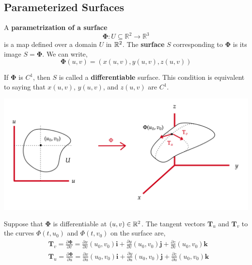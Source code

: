 \subsection{Parameterized Surfaces}
\begin{defn}
	A \textbf{parametrization of a surface}
	\[\mathbf{\Phi}: U \subseteq \mathbb{R}^2 \rightarrow \mathbb{R}^3\]
	\sloppy is a map defined over a domain $U$ in $\mathbb{R}^2$. The \textbf{surface} $S$ corresponding to $\mathbf{\Phi}$ is its image $S = \mathbf{\Phi}$. We can write,
	\[\mathbf{\Phi}(u, v) = (x(u, v), y(u, v), z(u, v))\]
\end{defn}

\begin{rmk}
	If $\mathbf{\Phi}$ is $C^1$, then $S$ is called a \textbf{differentiable} surface. This condition is equivalent to saying that $x(u,v)$, $y(u,v)$, and $z(u,v)$ are $C^1$.
\end{rmk}

\begin{center}
\includegraphics[width=\linewidth]{figures/wk-6/fig-13.png}
\end{center}

\hfill 

\noindent Suppose that $\mathbf{\Phi}$ is differentiable at $(u,v) \in \mathbb{R}^2$. The tangent vectors  $\mathbf{T}_u$ and $\mathbf{T}_v$ to the curves $\Phi(t, u_0)$ and $\Phi(t, v_0)$ on the surface are,
\begin{align*}
	&\mathbf{T}_v=\frac{\partial \boldsymbol{\Phi}}{\partial v}=\frac{\partial x}{\partial v}\left(u_0, v_0\right) \mathbf{i}+\frac{\partial y}{\partial v}\left(u_0, v_0\right) \mathbf{j}+\frac{\partial z}{\partial v}\left(u_0, v_0\right) \mathbf{k} \\
	&\mathbf{T}_u=\frac{\partial \boldsymbol{\Phi}}{\partial u}=\frac{\partial x}{\partial u}\left(u_0, v_0\right) \mathbf{i}+\frac{\partial y}{\partial u}\left(u_0, v_0\right) \mathbf{j}+\frac{\partial z}{\partial u}\left(u_0, v_0\right) \mathbf{k}
\end{align*}

